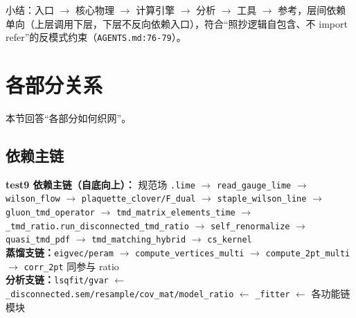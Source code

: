 \documentclass[UTF8]{ctexart}
\begin{document}
小结：入口 $\rightarrow$ 核心物理 $\rightarrow$ 计算引擎 $\rightarrow$ 分析 $\rightarrow$ 工具 $\rightarrow$ 参考，层间依赖单向（上层调用下层，下层不反向依赖入口），符合“照抄逻辑自包含、不 import refer”的反模式约束（\texttt{\nolinkurl{AGENTS.md:76-79}}）。

\section{各部分关系}
\label{sec:relation}
本节回答“各部分如何织网”。

\subsection{依赖主链}
\begin{keybox}
\textbf{test9 依赖主链（自底向上）：}
\textcolor{relation}{规范场 \texttt{\nolinkurl{.lime}} $\rightarrow$ \texttt{\nolinkurl{read\_gauge\_lime}} $\rightarrow$ \texttt{\nolinkurl{wilson\_flow}} $\rightarrow$ \texttt{\nolinkurl{plaquette\_clover/F\_dual}} $\rightarrow$ \texttt{\nolinkurl{staple\_wilson\_line}} $\rightarrow$ \texttt{\nolinkurl{gluon\_tmd\_operator}} $\rightarrow$ \texttt{\nolinkurl{tmd\_matrix\_elements\_time}} $\rightarrow$ \texttt{\nolinkurl{\_tmd\_ratio.run\_disconnected\_tmd\_ratio}} $\rightarrow$ \texttt{\nolinkurl{self\_renormalize}} $\rightarrow$ \texttt{\nolinkurl{quasi\_tmd\_pdf}} $\rightarrow$ \texttt{\nolinkurl{tmd\_matching\_hybrid}} $\rightarrow$ \texttt{\nolinkurl{cs\_kernel}} } \\
\textbf{蒸馏支链：}\textcolor{relation}{\texttt{\nolinkurl{eigvec/peram}} $\rightarrow$ \texttt{\nolinkurl{compute\_vertices\_multi}} $\rightarrow$ \texttt{\nolinkurl{compute\_2pt\_multi}} $\rightarrow$ \texttt{\nolinkurl{corr\_2pt}} 同参与 ratio} \\
\textbf{分析支链：}\textcolor{relation}{\texttt{\nolinkurl{lsqfit/gvar}} $\leftarrow$ \texttt{\nolinkurl{\_disconnected.sem/resample/cov\_mat/model\_ratio}} $\leftarrow$ \texttt{\nolinkurl{\_fitter}} $\leftarrow$ 各功能链模块}
\end{keybox}
\end{document}
